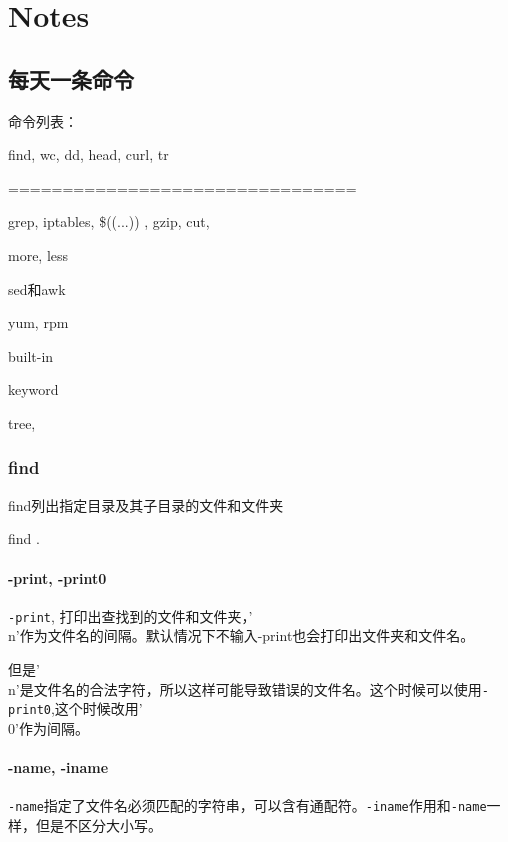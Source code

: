 \chapter{Notes}

\section{每天一条命令}
命令列表：


find, wc, dd, head, curl, tr



================================



grep, iptables, \$((...)) ,  gzip, cut,

more, less

sed和awk

yum, rpm

built-in

keyword

tree, 



\subsection{find}

find列出指定目录及其子目录的文件和文件夹

\begin{Bash}[查找当前目录及子目录的文件和文件夹]
find .
\end{Bash}


\subsubsection{-print, -print0}
\lstinline$-print$, 打印出查找到的文件和文件夹，'\\n'作为文件名的间隔。默认情况下不输入-print也会打印出文件夹和文件名。

但是'\\n'是文件名的合法字符，所以这样可能导致错误的文件名。这个时候可以使用\lstinline$-print0$,这个时候改用'\\0'作为间隔。

\subsubsection{-name, -iname}

\lstinline$-name$指定了文件名必须匹配的字符串，可以含有通配符。\lstinline$-iname$作用和\lstinline$-name$一样，但是不区分大小写。

